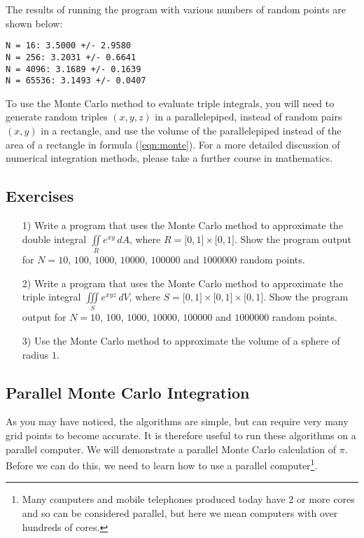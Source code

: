 The results of running the program with various numbers of random points
are shown below:

\begin{verbatim}
N = 16: 3.5000 +/- 2.9580
N = 256: 3.2031 +/- 0.6641
N = 4096: 3.1689 +/- 0.1639
N = 65536: 3.1493 +/- 0.0407
\end{verbatim}

To use the Monte Carlo method to evaluate triple integrals, you will need to generate random triples $(x,y,z)$ in a
parallelepiped, instead of random pairs $(x,y)$ in a rectangle, and use the volume of the parallelepiped instead of the
area of a rectangle in formula (\ref{eqn:monte}). For a more detailed discussion of numerical integration methods, please take a further course in mathematics.

\subsection{Exercises}
\begin{enumerate}
 \item[1)] Write a program that uses the Monte Carlo method to approximate the double integral
  $\iint\limits_{R} e^{xy}\,dA$, where $R = \lbrack 0,1 \rbrack \times \lbrack 0,1 \rbrack$. Show the program output
  for $N=10$, $100$, $1000$, $10000$, $100000$ and $1000000$ random points.
 \item[2)] Write a program that uses the Monte Carlo method to approximate the triple integral
  $\iiint\limits_{S} e^{xyz}\,dV$, where $S= \lbrack 0,1 \rbrack \times \lbrack 0,1 \rbrack \times \lbrack 0,1 \rbrack$.
  Show the program output for $N=10$, $100$, $1000$, $10000$, $100000$ and $1000000$ random points.
 \item[3)] Use the Monte Carlo method to approximate the volume of a sphere of radius $1$.
 \end{enumerate}

\subsection{Parallel Monte Carlo Integration}

As you may have noticed, the algorithms are simple, but can require very many grid points to become accurate. It is therefore useful to run these algorithms on a parallel computer. We will demonstrate a parallel Monte Carlo calculation of $\pi$. Before we can do this, we need to learn how to use a parallel computer\footnote{Many computers and mobile telephones produced today have 2 or more cores and so can be considered parallel, but  here we mean computers with over hundreds of cores.}. 

